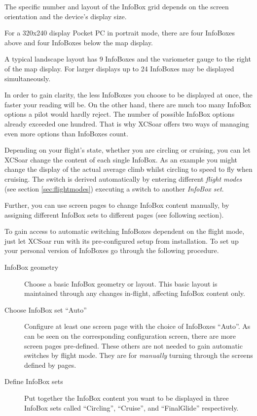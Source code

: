 The specific number and layout of the InfoBox grid depends on the
screen orientation and the device's display size.  

For a 320x240 display
Pocket PC in portrait mode, there are four InfoBoxes above and four
InfoBoxes below the map display.  %

A typical landscape layout has 9 InfoBoxes and the variometer gauge 
to the right of the map display. 
For larger displays up to 24 InfoBoxes may be displayed simultaneously.  

In order to gain clarity, the less InfoBoxes you choose to be displayed at once,
the faster your reading will be. On the other hand, there are much too many 
InfoBox options a pilot would hardly reject. The number of possible InfoBox 
options already exceeded one hundred. That is why XCSoar offers two ways of 
managing even more options than InfoBoxes count.

Depending on your flight's state, whether you are circling or cruising, you can 
let XCSoar change the content of each single InfoBox. As an example you might 
change the display of the actual average climb whilst circling to speed to fly 
when cruising. The switch is derived automatically by entering different 
\emph{flight modes} (see section \ref{sec:flightmodes}) executing a switch to 
another \emph{InfoBox set}.

Further, you can use screen pages to change InfoBox content manually, by 
assigning different InfoBox sets to different pages (see following section).

To gain access to automatic switching InfoBoxes dependent on the flight mode, 
just let XCSoar run with its pre-configured setup from installation. To set up 
your personal version of InfoBoxes go through the following procedure.
\begin{description}
\item[InfoBox geometry] Choose a basic InfoBox geometry or layout.  This basic
layout is maintained through any changes in-flight, affecting InfoBox content 
only.
\item[Choose InfoBox set ``Auto''] Configure at least one screen page with the
choice of InfoBoxes ``Auto''. As can be seen on the corresponding configuration
screen, there are more screen pages pre-defined.   These 
others are not needed to gain automatic switches by flight mode. They are for \emph{manually} turning through the screens defined by pages. 
\item[Define InfoBox sets] Put together the InfoBox content you want to be
displayed in three InfoBox sets called ``Circling'', ``Cruise'', and ``FinalGlide''
respectively.
\end{description}  


